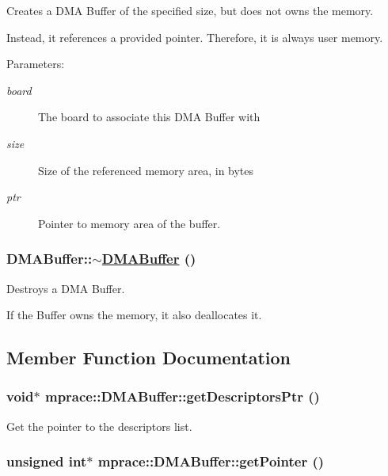Creates a DMA Buffer of the specified size, but does not owns the memory. 

Instead, it references a provided pointer. Therefore, it is always user memory.

\begin{Desc}
\item[Parameters:]
\begin{description}
\item[{\em board}]The board to associate this DMA Buffer with \item[{\em size}]Size of the referenced memory area, in bytes \item[{\em ptr}]Pointer to memory area of the buffer.\end{description}
\end{Desc}
\hypertarget{classmprace_1_1DMABuffer_a2}{
\subsubsection[$\sim$DMABuffer]{\setlength{\rightskip}{0pt plus 5cm}DMABuffer::$\sim$\hyperlink{classmprace_1_1DMABuffer}{DMABuffer} ()}}
\label{classmprace_1_1DMABuffer_a2}


Destroys a DMA Buffer. 

If the Buffer owns the memory, it also deallocates it.

\subsection{Member Function Documentation}
\hypertarget{classmprace_1_1DMABuffer_a7}{
\subsubsection[getDescriptorsPtr]{\setlength{\rightskip}{0pt plus 5cm}void$\ast$ mprace::DMABuffer::get\-Descriptors\-Ptr ()}}
\label{classmprace_1_1DMABuffer_a7}


Get the pointer to the descriptors list. 

\hypertarget{classmprace_1_1DMABuffer_a3}{
\subsubsection[getPointer]{\setlength{\rightskip}{0pt plus 5cm}unsigned int$\ast$ mprace::DMABuffer::get\-Pointer ()}}
\label{classmprace_1_1DMABuffer_a3}


